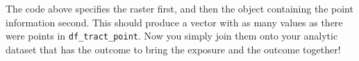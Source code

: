 \documentclass[
]{book}
\newenvironment{Shaded}{\begin{snugshade}}{\end{snugshade}}
\newcommand{\NormalTok}[1]{#1}
\newcommand{\OtherTok}[1]{\textcolor[rgb]{0.56,0.35,0.01}{#1}}
\newcommand{\SpecialCharTok}[1]{\textcolor[rgb]{0.81,0.36,0.00}{\textbf{#1}}}
\begin{document}
The code above specifies the raster first, and then the object containing the point information second. This should produce a vector with as many values as there were points in \texttt{df\_tract\_point}. Now you simply join them onto your analytic dataset that has the outcome to bring the exposure and the outcome together!

\begin{Shaded}
\end{Shaded}


  
\end{document}
